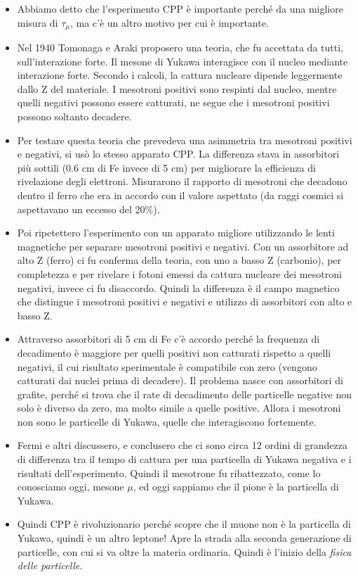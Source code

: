 \begin{itemize}
    \item Abbiamo detto che l'esperimento CPP è importante perché da una migliore misura di $\tau_\mu$, ma c'è un altro motivo per cui è importante.
    \item Nel 1940 Tomonaga e Araki proposero una teoria, che fu accettata da tutti, sull'interazione forte. Il mesone di Yukawa interagisce con il nucleo mediante interazione forte. Secondo i calcoli, la cattura nucleare dipende leggermente dallo Z del materiale. I mesotroni positivi sono respinti dal nucleo, mentre quelli negativi possono essere catturati, ne segue che i mesotroni positivi possono soltanto decadere.
    \item  Per testare questa teoria che prevedeva una asimmetria tra mesotroni positivi e negativi, si usò lo stesso apparato CPP. La differenza stava in assorbitori più sottili (0.6 cm di Fe invece di 5 cm) per migliorare la efficienza di rivelazione degli elettroni. Misurarono il rapporto di mesotroni che decadono dentro il ferro che era in accordo con il valore aspettato (da raggi cosmici si aspettavano un eccesso del 20\%).
    \item Poi ripetettero l'esperimento con un apparato migliore utilizzando le lenti magnetiche per separare mesotroni positivi e negativi. Con un assorbitore ad alto Z (ferro) ci fu conferma della teoria, con uno a basso Z (carbonio), per completezza e per rivelare i fotoni emessi da cattura nucleare dei mesotroni negativi, invece ci fu disaccordo. Quindi la differenza è il campo magnetico che distingue i mesotroni positivi e negativi e utilizzo di assorbitori con alto e basso Z.
    \item Attraverso assorbitori di 5 cm di Fe c'è accordo perché la frequenza di decadimento è maggiore per quelli positivi non catturati rispetto a quelli negativi, il cui risultato sperimentale è compatibile con zero (vengono catturati dai nuclei prima di decadere). Il problema nasce con assorbitori di grafite, perché si trova che il rate di decadimento delle particelle negative non solo è diverso da zero, ma molto simile a quelle positive. Allora i mesotroni non sono le particelle di Yukawa, quelle che interagiscono fortemente.
    \item Fermi e altri discussero, e conclusero che ci sono circa 12 ordini di grandezza di differenza tra il tempo di cattura per una particella di Yukawa negativa e i risultati dell'esperimento. Quindi il mesotrone fu ribattezzato, come lo conosciamo oggi, mesone $\mu$, ed oggi sappiamo che il pione è la particella di Yukawa.
    \item Quindi CPP è rivoluzionario perché scopre che il muone non è la particella di Yukawa, quindi è un altro leptone! Apre la strada alla seconda generazione di particelle, con cui si va oltre la materia ordinaria. Quindi è l'inizio della \textit{fisica delle particelle}.
\end{itemize}
